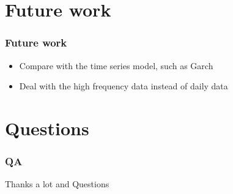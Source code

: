 \documentclass{beamer}
\begin{document}
\section{Future work}
\begin{frame}
\frametitle{Future work}
    \begin{itemize}
        \item  Compare with the time series model, such as Garch
        \item  Deal with the high frequency data instead of daily data
      \end{itemize}
\end{frame}

\section{Questions}
\begin{frame}
\frametitle{QA}
\begin{center}
\huge{Thanks a lot and Questions}
\end{center}
\end{frame}

\end{document}
